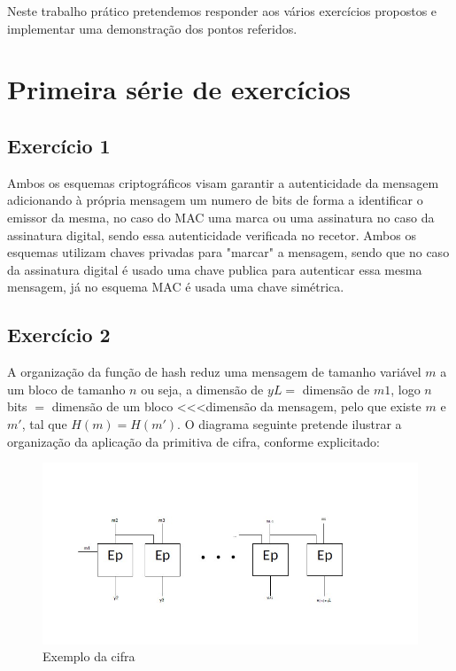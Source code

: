 \documentclass[11pt]{report}
\begin{document}
Neste trabalho prático pretendemos responder aos vários exercícios propostos e implementar uma demonstração dos pontos referidos.

\newpage

\section{Primeira série de exercícios}
\subsection{Exercício 1}

Ambos os esquemas criptográficos visam garantir a autenticidade da mensagem adicionando à própria mensagem um numero de bits de forma a identificar o emissor da mesma, no caso do MAC uma marca ou uma assinatura no caso da assinatura digital, sendo essa autenticidade verificada no recetor. Ambos os esquemas utilizam chaves privadas para "marcar" \space a mensagem, sendo que no caso da assinatura digital é usado uma chave publica para autenticar essa mesma mensagem, já no esquema MAC é usada uma chave simétrica.\\

\subsection{Exercício 2}
A organização da função de hash reduz uma mensagem de tamanho variável $ m $ a um bloco de tamanho $ n $ ou seja, a dimensão de $ yL = $ dimensão de $ m1 $, logo $ n $ bits $ = $ dimensão de um bloco <<<\space dimensão da mensagem, pelo que existe $ m $ e $ m' $, tal que $ H(m) = H(m')$. O diagrama seguinte pretende ilustrar a organização da aplicação da primitiva de cifra, conforme explicitado:\\

\begin{figure}[H]
	\centering
	\includegraphics[scale=0.5]{img/ex2.jpg}
	\caption{Exemplo da cifra}
\end{figure}
\end{document}
